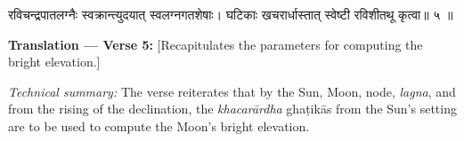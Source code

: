 \documentclass[11pt,a4paper]{article}
\newcommand{\dev}[1]{{\devanagarifont #1}}
\newenvironment{sanskritverse}{%
  \begin{center}\begin{minipage}{0.95\textwidth}
  \setlength{\leftskip}{1em}
  \setlength{\rightskip}{1em}
  \dev
}{\end{minipage}\end{center}}
\newenvironment{paracol}[1]{\begingroup}{\endgroup}
\newcommand{\switchcolumn}[1][]{%
  \ifnum#1=0\relax\else\par\nobreak\vspace{0.5em}\par\nobreak\fi%
}
\begin{document}
\begin{paracol}{2}

\begin{sanskritverse}
रविचन्द्रपातलग्नैः स्वक्रान्त्युदयात् स्वलग्नगतशेषाः।
घटिकाः खचरार्धास्तात् स्वेष्टी रविशीतथू कृत्वा॥ ५ ॥
\end{sanskritverse}

\switchcolumn

\textbf{Translation — Verse 5:} [Recapitulates the parameters for computing the bright elevation.]

\textit{Technical summary:} The verse reiterates that by the Sun, Moon, node, \textit{lagna}, and from the rising of the declination, the \textit{khacarārdha} ghaṭikās from the Sun's setting are to be used to compute the Moon's bright elevation.

\end{paracol}

\vspace{0.5em}
\end{document}
